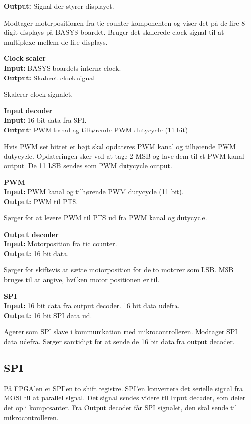 \textbf{Output:} Signal der styrer displayet.

Modtager motorpositionen fra tic counter komponenten og viser det på de fire 8-digit-displays 
på BASYS boardet. Bruger det skalerede clock signal til at multiplexe mellem de 
fire displays.

\textbf{Clock scaler}\\
\textbf{Input:} BASYS boardets interne clock.\\
\textbf{Output:} Skaleret clock signal

Skalerer clock signalet.

\textbf{Input decoder}\\
\textbf{Input:} 16 bit data fra SPI.\\
\textbf{Output:} PWM kanal og tilhørende PWM dutycycle (11 bit).

Hvis PWM set bittet er højt skal opdateres PWM kanal og tilhørende PWM dutycycle.
Opdateringen sker ved at tage 2 MSB og lave dem til et PWM kanal output. De 11 
LSB sendes som PWM dutycycle output.

\textbf{PWM}\\
\textbf{Input:} PWM kanal og tilhørende PWM dutycycle (11 bit).\\
\textbf{Output:} PWM til PTS.

Sørger for at levere PWM til PTS ud fra PWM kanal og dutycycle.

\textbf{Output decoder}\\
\textbf{Input:} Motorposition fra tic counter.\\
\textbf{Output:} 16 bit data.

Sørger for skiftevis at sætte motorposition for de to motorer som LSB.
MSB bruges til at angive, hvilken motor positionen er til.

\textbf{SPI}\\
\textbf{Input:} 16 bit data fra output decoder. 16 bit data udefra.\\
\textbf{Output:} 16 bit SPI data ud.

Agerer som SPI slave i kommunikation med mikrocontrolleren.
Modtager SPI data udefra. Sørger samtidigt for at sende de 16 bit data fra output decoder.


\subsection{SPI}
På FPGA'en er SPI'en to shift registre. SPI'en konvertere det serielle signal fra MOSI til at parallel signal. Det signal sendes videre til Input decoder, som deler det op i komposanter. Fra Output decoder får SPI signalet, den skal sende til mikrocontrolleren.



